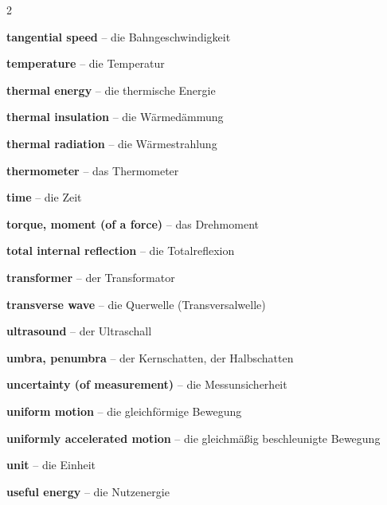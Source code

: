 \begin{multicols}{2}
\par\nopagebreak
\textbf{tangential speed} -- die Bahngeschwindigkeit\dotfill\hyperref[e:55]{\pageref*{e:55}}\par
\textbf{temperature} -- die Temperatur\dotfill\hyperref[e:113]{\pageref*{e:113}}\par
\textbf{thermal energy} -- die thermische Energie\dotfill\hyperref[e:100]{\pageref*{e:100}}\par
\textbf{thermal insulation} -- die Wärmedämmung\dotfill\hyperref[e:123]{\pageref*{e:123}}\par
\textbf{thermal radiation} -- die Wärmestrahlung\dotfill\hyperref[e:122]{\pageref*{e:122}}\par
\textbf{thermometer} -- das Thermometer\dotfill\hyperref[e:116]{\pageref*{e:116}}\par
\textbf{time} -- die Zeit\dotfill\hyperref[e:36]{\pageref*{e:36}}\par
\textbf{torque, moment (of a force)} -- das Drehmoment\dotfill\hyperref[e:81]{\pageref*{e:81}}\par
\textbf{total internal reflection} -- die Totalreflexion\dotfill\hyperref[e:238]{\pageref*{e:238}}\par
\textbf{transformer} -- der Transformator\dotfill\hyperref[e:188]{\pageref*{e:188}}\par
\textbf{transverse wave} -- die Querwelle (Transversalwelle)\dotfill\hyperref[e:205]{\pageref*{e:205}}\par

\par\nopagebreak
\textbf{ultrasound} -- der Ultraschall\dotfill\hyperref[e:218]{\pageref*{e:218}}\par
\textbf{umbra, penumbra} -- der Kernschatten, der Halbschatten\dotfill\hyperref[e:226]{\pageref*{e:226}}\par
\textbf{uncertainty (of measurement)} -- die Messunsicherheit\dotfill\hyperref[e:14]{\pageref*{e:14}}\par
\textbf{uniform motion} -- die gleichförmige Bewegung\dotfill\hyperref[e:42]{\pageref*{e:42}}\par
\textbf{uniformly accelerated motion} -- die gleichmäßig beschleunigte Bewegung\dotfill\hyperref[e:43]{\pageref*{e:43}}\par
\textbf{unit} -- die Einheit\dotfill\hyperref[e:3]{\pageref*{e:3}}\par
\textbf{useful energy} -- die Nutzenergie\dotfill\hyperref[e:107]{\pageref*{e:107}}\par


\end{multicols}
